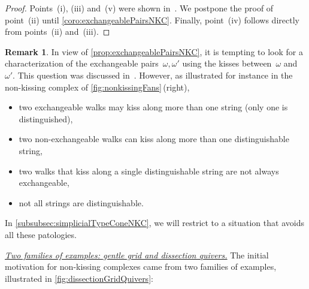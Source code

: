 \documentclass{amsart}
\theoremstyle{definition}
\newtheorem{remark}[theorem]{Remark}
\newcommand{\para}[1]{\medskip\noindent\uline{\textit{#1.}}} %
\begin{document}
\begin{proof}
Points~(i), (iii) and~(v) were shown in~\cite[Prop.~2.33, Thm.~4.17 \& Prop~4.16]{PaluPilaudPlamondon-nonkissing}. We postpone the proof of point~(ii) until \cref{coro:exchangeablePairsNKC}. Finally, point~(iv) follows directly from points~(ii) and~(iii).
\end{proof}

\begin{remark}
\label{rem:exchangeablePairsNKC}
\enlargethispage{.7cm}
In view of \cref{prop:exchangeablePairsNKC}, it is tempting to look for a characterization of the exchangeable pairs~$\omega, \omega'$ using the kisses between~$\omega$ and~$\omega'$.
This question was discussed in~\cite[Sect.~9]{BrustleDouvilleMousavandThomasYildirim}.
However, as illustrated for instance in the non-kissing complex of \cref{fig:nonkissingFans}\,(right),
\begin{itemize}
\item two exchangeable walks may kiss along more than one string (only one is distinguished),
\item two non-exchangeable walks can kiss along more than one distinguishable string,
\item two walks that kiss along a single distinguishable string are not always exchangeable,
\item not all strings are distinguishable.
\end{itemize}
In \cref{subsubsec:simplicialTypeConeNKC}, we will restrict to a situation that avoids all these patologies.
\end{remark}

\para{Two families of examples: gentle grid and dissection quivers}
%
The initial motivation for non-kissing complexes came from two families of examples, illustrated in \cref{fig:dissectionGridQuivers}:
\end{document}
